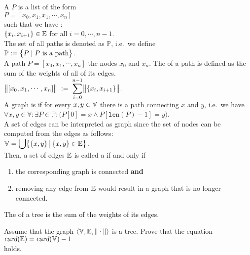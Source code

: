 \noindent
A  $P$ is a list of the form 
\\[0.2cm]
\hspace*{1.3cm} 
$P = [ x_0, x_1, x_1, \cdots, x_n ]$ 
\\[0.2cm]
such that we have : \\[0.2cm]
\hspace*{1.3cm}
$\{x_i,x_{i+1}\} \in {\mathbb E}$  \quad for all $i = 0, \cdots, n-1$.
\\[0.2cm]
The set of all paths is denoted as $\mathbb{P}$, i.e.~we define
\\[0.2cm]
\hspace*{1.3cm}
$\displaystyle \mathbb{P}  := \bigl\{ P \mid \mbox{$P$ is a path} \bigr\}$.
\\[0.2cm]
A path $P = [ x_0, x_1, \cdots, x_n]$  the nodes $x_0$ and $x_n$.  The  of a path is defined as
the sum of the weights of all of its edges.  
\\[0.2cm]
\hspace*{1.3cm}
 $\displaystyle\bigl\|[x_0,x_1, \cdots, x_n]\bigr\| \;:=\; \sum\limits_{i=0}^{n-1} \bigl\|\{x_i,x_{i+1}\}\bigr\|$. 
\\[0.2cm]
A graph is  if for every $x,y \in {\mathbb V}$ there is a path connecting $x$ and $y$, i.e.~we have
\\[0.2cm]
\hspace*{1.3cm}
$\forall x, y \in \mathbb{V}: \exists P \in \mathbb{P}: \bigl(P[0] = x \wedge P[\texttt{len}(P)-1] = y\bigr)$.
\\[0.2cm]
A set of edges can be interpreted as graph since the set of nodes can be computed from the edges as
follows: 
\\[0.2cm]
\hspace*{1.3cm}
$\displaystyle{\mathbb V} = \bigcup \bigl\{\{x,y\} \,\big|\, \{x,y\} \in {\mathbb E} \bigr\}$.
\\[0.2cm]
Then, a set of edges ${\mathbb E}$ is called a  if and only if
\begin{enumerate}
\item the corresponding graph is connected \quad \textbf{and}
\item removing any edge from ${\mathbb E}$ would result in a graph that is no longer connected.
\end{enumerate}
The  of a tree is the sum of the weights of its edges.

\exercise
Assume that the graph $\langle {\mathbb V}, {\mathbb E}, \|\cdot\|\rangle$ is a tree.  Prove that the equation
\\[0.2cm]
\hspace*{1.3cm}
$\textsl{card}({\mathbb E}) = \textsl{card}({\mathbb V}) - 1$
\\[0.2cm]
holds.  
\vspace*{0.2cm}

